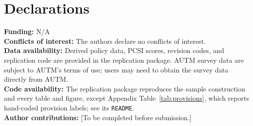 \section*{Declarations}
\noindent\textbf{Funding:} N/A\\
\textbf{Conflicts of interest:} The authors declare no conflicts of interest.\\
\textbf{Data availability:} Derived policy data, PCSI scores, revision codes, and replication code are provided in the replication package. AUTM survey data are subject to AUTM's terms of use; users may need to obtain the survey data directly from AUTM.\\
\textbf{Code availability:} The replication package reproduces the sample construction and every table and figure, except Appendix Table~\ref{tab:provisions}, which reports hand-coded provision labels; see its \texttt{README}.\\
\textbf{Author contributions:} [To be completed before submission.]
